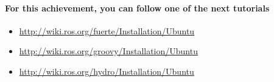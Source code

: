 \documentclass[a4paper,10pt,twoside]{book}
\begin{document}
				
				
				
				\paragraph{For this achievement, you can follow one of the next tutorials }
				
				\begin{itemize}
				
					\item \url{http://wiki.ros.org/fuerte/Installation/Ubuntu}
					\item \url{http://wiki.ros.org/groovy/Installation/Ubuntu}
					\item \url{http://wiki.ros.org/hydro/Installation/Ubuntu}
				
				\end{itemize}
				
				
				
		



\ifx\wholebook\relax\else
\end{document}
